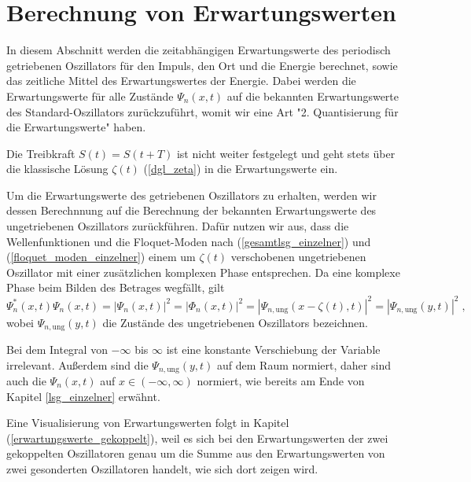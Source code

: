 

\chapter{Berechnung von Erwartungswerten}
\label{3}
  In diesem Abschnitt werden die zeitabhängigen Erwartungswerte des periodisch getriebenen Oszillators für den Impuls, den Ort und die Energie berechnet, sowie das zeitliche Mittel des Erwartungswertes der Energie.
  Dabei werden die Erwartungswerte für alle Zustände $\Psi_n(x,t)$ auf die bekannten Erwartungswerte des Standard-Oszillators zurückzuführt, womit wir eine Art "2. Quantisierung für die Erwartungswerte" haben.

  Die Treibkraft $S(t)=S(t+T)$ ist nicht weiter festgelegt und geht stets über die klassische Lösung $\zeta(t)$ (\ref{dgl_zeta}) in die Erwartungswerte ein.

  Um die Erwartungswerte des getriebenen Oszillators zu erhalten, werden wir dessen Berechnnung auf die Berechnung der bekannten Erwartungswerte des ungetriebenen Oszillators zurückführen.
  Dafür nutzen wir aus, dass die Wellenfunktionen und die Floquet-Moden nach (\ref{gesamtlsg_einzelner}) und (\ref{floquet_moden_einzelner}) einem um $\zeta(t)$ verschobenen ungetriebenen Oszillator mit einer zusätzlichen komplexen Phase entsprechen.
  Da eine komplexe Phase beim Bilden des Betrages wegfällt, gilt
  \begin{equation}
    \Psi_n^*(x,t)\Psi_n(x,t) = |\Psi_n(x,t)|^2 = |\Phi_n(x,t)|^2 = |\Psi_{n,\text{ung}}(x-\zeta(t),t)|^2 = |\Psi_{n,\text{ung}}(y,t)|^2 \; ,
    \label{betrag_einzelner}
  \end{equation}
  wobei $\Psi_{n,\text{ung}}(y,t)$ die Zustände des ungetriebenen Oszillators bezeichnen.

  Bei dem Integral von $-\infty$ bis $\infty$ ist eine konstante Verschiebung der Variable irrelevant.
  Außerdem sind die $\Psi_{n,\text{ung}}(y,t)$ auf dem Raum normiert, daher sind auch die $\Psi_n(x,t)$ auf $x \in (-\infty,\infty)$ normiert, wie bereits am Ende von Kapitel \ref{lsg_einzelner} erwähnt.

  Eine Visualisierung von Erwartungswerten folgt in Kapitel (\ref{erwartungswerte_gekoppelt}), weil es sich bei den Erwartungswerten der zwei gekoppelten Oszillatoren genau um die Summe aus den Erwartungswerten von zwei gesonderten Oszillatoren handelt, wie sich dort zeigen wird.


